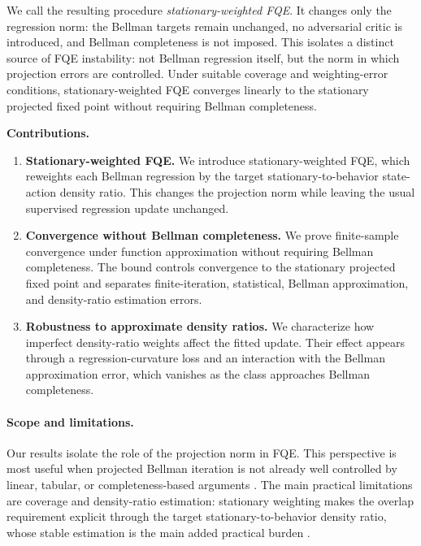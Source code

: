 \documentclass{article}
\theoremstyle{plain}
\theoremstyle{definition}
\theoremstyle{remark}
\begin{document}
We call the resulting procedure \emph{stationary-weighted FQE}. It changes only
the regression norm: the Bellman targets remain unchanged, no adversarial critic
is introduced, and Bellman completeness is not imposed. This isolates a distinct
source of FQE instability: not Bellman regression itself, but the norm in which
projection errors are controlled. Under suitable coverage and weighting-error
conditions, stationary-weighted FQE converges linearly to the stationary
projected fixed point without requiring Bellman completeness.

\textbf{Contributions.}
\begin{enumerate}[leftmargin=1.5em]
\item \textbf{Stationary-weighted FQE.}
We introduce stationary-weighted FQE, which reweights each Bellman regression by
the target stationary-to-behavior state-action density ratio. This changes the
projection norm while leaving the usual supervised regression update unchanged.

\item \textbf{Convergence without Bellman completeness.}
We prove finite-sample convergence under function approximation without
requiring Bellman completeness. The bound controls convergence to the stationary
projected fixed point and separates finite-iteration, statistical, Bellman
approximation, and density-ratio estimation errors.

\item \textbf{Robustness to approximate density ratios.}
We characterize how imperfect density-ratio weights affect the fitted update.
Their effect appears through a regression-curvature loss and an interaction with
the Bellman approximation error, which vanishes as the class approaches Bellman
completeness.
\end{enumerate}

\paragraph{Scope and limitations.}
Our results isolate the role of the projection norm in FQE. This perspective is
most useful when projected Bellman iteration is not already well controlled by
linear, tabular, or completeness-based arguments
\citep{melo2007convergence,yang2020reinforcement,jin2023provably}. The main
practical limitations are coverage and density-ratio estimation: stationary
weighting makes the overlap requirement explicit through the target
stationary-to-behavior density ratio, whose stable estimation is the main added
practical burden
\citep{jiang2021emphatic,patterson2022generalized,uehara2021finite}.
\end{document}
